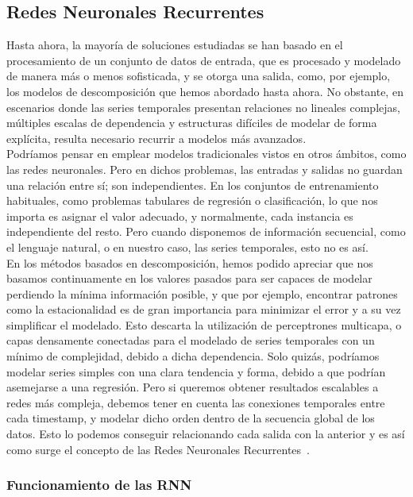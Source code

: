 \subsection{Redes Neuronales Recurrentes}

Hasta ahora, la mayoría de soluciones estudiadas se han basado en el procesamiento de un conjunto de datos de entrada, que es procesado y modelado de manera más o menos sofisticada, y se otorga una salida, como, por ejemplo, los modelos de descomposición que hemos abordado hasta ahora. No obstante, en escenarios donde las series temporales presentan relaciones no lineales complejas, múltiples escalas de dependencia y estructuras difíciles de modelar de forma explícita, resulta necesario recurrir a modelos más avanzados.\\

Podríamos pensar en emplear modelos tradicionales vistos en otros ámbitos, como las redes neuronales. Pero en dichos problemas, las entradas y salidas no guardan una relación entre sí; son independientes. En los conjuntos de entrenamiento habituales, como problemas tabulares de regresión o clasificación, lo que nos importa es asignar el valor adecuado, y normalmente, cada instancia es independiente del resto. Pero cuando disponemos de información secuencial, como el lenguaje natural, o en nuestro caso, las series temporales, esto no es así.\\

En los métodos basados en descomposición, hemos podido apreciar que nos basamos continuamente en los valores pasados para ser capaces de modelar perdiendo la mínima información posible, y que por ejemplo, encontrar patrones como la estacionalidad es de gran importancia para minimizar el error y a su vez simplificar el modelado. Esto descarta la utilización de perceptrones multicapa, o capas densamente conectadas para el modelado de series temporales con un mínimo de complejidad, debido a dicha dependencia. Solo quizás, podríamos modelar series simples con una clara tendencia y forma, debido a que podrían asemejarse a una regresión. Pero si queremos obtener resultados escalables a redes más compleja, debemos tener en cuenta las conexiones temporales entre cada timestamp, y modelar dicho orden dentro de la secuencia global de los datos. Esto lo podemos conseguir relacionando cada salida con la anterior y es así como surge el concepto de las Redes Neuronales Recurrentes~\cite{petneházi2019recurrentneuralnetworkstime}.

\subsubsection{Funcionamiento de las RNN}

